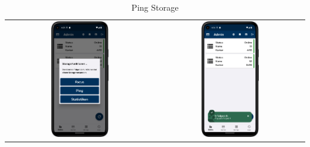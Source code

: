 \vspace{1cm}
\begin{table}[htbp]
  \centering
  \begin{tabular}{cc}
    \includegraphics[width=0.4\textwidth]{FLUTTER/images/ZB/status_page_selector.png} &
    \includegraphics[width=0.4\textwidth]{FLUTTER/images/ZB/status_ping_storage.png} \\
  \end{tabular}
  \label{tab:example}
  \captionsetup{type=figure}
  \caption{Ping Storage}
\end{table}

